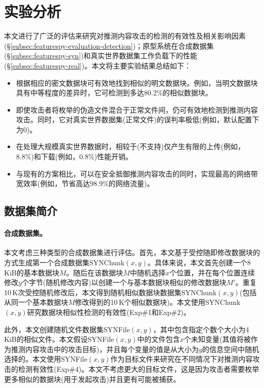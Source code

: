 \section{实验分析}
\label{sec:featurespy-evaluation}

本文进行了广泛的评估来研究\sysnameF 对推测内容攻击的检测的有效性及相关影响因素(\S\ref{subsec:featurespy-evaluation-detection})；原型系统\prototype 在合成数据集(\S\ref{subsec:featurespy-syn})和真实世界数据集工作负载下的性能(\S\ref{subsec:featurespy-real})。本文将主要实验结果总结如下：

\begin{itemize}
  \item \sysnameF 根据相应的密文数据块可有效地找到相似的明文数据块。例如，当明文数据块具有中等程度的差异时，它可检测到多达80.2\%的相似数据块。
  \item 即使攻击者将枚举的伪造文件混合于正常文件间，\sysnameF 仍可有效地检测到推测内容攻击。同时，它对真实世界数据集(正常文件)的误判率极低(例如，默认配置下为0)。
  \item \prototype 在处理大规模真实世界数据时，相较于\sysnameS (不支持\sysnameF)仅产生有限的上传(例如，8.8\%)和下载(例如，0.8\%)性能开销。
  \item 与现有的\cite{harnik2010side, li15}方案相比，\prototype 可以在安全抵御推测内容攻击的同时，实现最高的网络带宽效率(例如，节省高达98.9\%的网络流量)。
\end{itemize}

\subsection{数据集简介}
\label{subsec:featurespy-datasets}

\paragraph*{合成数据集。}

本文考虑三种类型的合成数据集进行评估。首先，本文基于受控随即修改数据块的方式生成第一个合成数据集SYNChunk$(x, y)$。具体来说，本文首先创建一个8\,KiB的基本数据块$M$。随后在该数据块$M$中随机选择$x$个位置，并在每个位置连续修改$y$个字节(随机修改内容)以创建一个与基本数据块相似的修改数据块$M'$。重复10\,K次受控随机修改后，本文得到随机相似数据块数据集SYNChunk$(x, y)$(包括从同一个基本数据块$M$修改得到的10\,K个相似数据块)。本文使用SYNChunk$(x, y)$研究数据块相似性检测的有效性(Exp\#1和Exp\#2)。

此外，本文创建随机文件数据集SYNFile$(x, y)$，其中包含指定个数个大小为4\,KiB的相似文件。本文假设SYNFile$(x, y)$中的文件包含$x$个未知变量(其值将被作为推测内容攻击中的攻击目标)，并且每个变量的值是从大小为$y$的信息空间中随机选择的。本文使用SYNFile$(x, y)$作为目标文件来研究\sysnameF 在不同情况下对推测内容攻击的检测有效性(Exp\#4)。本文不考虑更大的目标文件，这是因为攻击者需要枚举更多相似的数据块(用于发起攻击)并且更有可能被\sysnameF 捕获。

